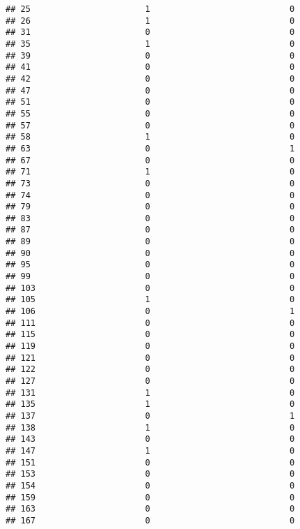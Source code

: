 \documentclass[
]{article}
\begin{document}
\begin{verbatim}
## 25                       1                            0
## 26                       1                            0
## 31                       0                            0
## 35                       1                            0
## 39                       0                            0
## 41                       0                            0
## 42                       0                            0
## 47                       0                            0
## 51                       0                            0
## 55                       0                            0
## 57                       0                            0
## 58                       1                            0
## 63                       0                            1
## 67                       0                            0
## 71                       1                            0
## 73                       0                            0
## 74                       0                            0
## 79                       0                            0
## 83                       0                            0
## 87                       0                            0
## 89                       0                            0
## 90                       0                            0
## 95                       0                            0
## 99                       0                            0
## 103                      0                            0
## 105                      1                            0
## 106                      0                            1
## 111                      0                            0
## 115                      0                            0
## 119                      0                            0
## 121                      0                            0
## 122                      0                            0
## 127                      0                            0
## 131                      1                            0
## 135                      1                            0
## 137                      0                            1
## 138                      1                            0
## 143                      0                            0
## 147                      1                            0
## 151                      0                            0
## 153                      0                            0
## 154                      0                            0
## 159                      0                            0
## 163                      0                            0
## 167                      0                            0

\end{verbatim}
\end{document}
